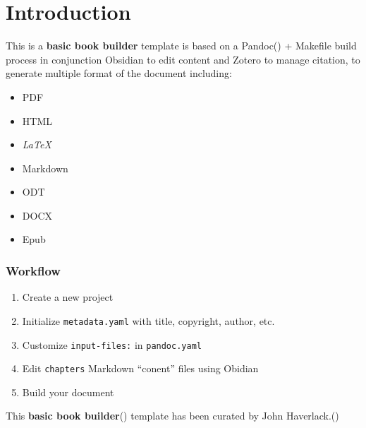 \documentclass[
  12pt,
  openany]{book}
\providecommand{\tightlist}{%
  \setlength{\itemsep}{0pt}\setlength{\parskip}{0pt}}
\begin{document}



\renewcommand*\contentsname{Contents}
{
\setcounter{tocdepth}{3}
\tableofcontents
}
\mainmatter
\chapter{Introduction}\label{introduction}

This is a \textbf{basic book builder} template is based on a
Pandoc() + Makefile build process in conjunction Obsidian to
edit content and Zotero to manage citation, to generate multiple format
of the document including:

\begin{itemize}
\tightlist
\item
  PDF
\item
  HTML
\item
  \emph{LaTeX}
\item
  Markdown
\item
  ODT
\item
  DOCX
\item
  Epub
\end{itemize}

\subsection{Workflow}\label{workflow}

\begin{enumerate}
\def\labelenumi{\arabic{enumi}.}
\tightlist
\item
  Create a new project
\item
  Initialize \texttt{metadata.yaml} with title, copyright, author, etc.
\item
  Customize \texttt{input-files:} in \texttt{pandoc.yaml}
\item
  Edit \texttt{chapters} Markdown ``conent'' files using Obidian
\item
  Build your document
\end{enumerate}

This \textbf{basic book
builder}() template has been curated by John
Haverlack.()
\end{document}

